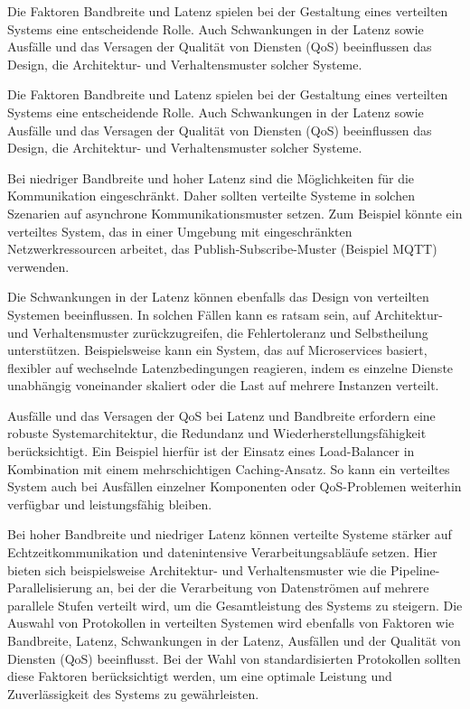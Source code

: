 Die Faktoren Bandbreite und Latenz spielen bei der Gestaltung eines verteilten Systems eine entscheidende Rolle. Auch Schwankungen in der Latenz sowie Ausfälle und das Versagen der Qualität von Diensten (QoS) beeinflussen das Design, die Architektur- und Verhaltensmuster solcher Systeme.

Die Faktoren Bandbreite und Latenz spielen bei der Gestaltung eines verteilten Systems eine entscheidende Rolle. Auch Schwankungen in der Latenz sowie Ausfälle und das Versagen der Qualität von Diensten (QoS) beeinflussen das Design, die Architektur- und Verhaltensmuster solcher Systeme.

Bei niedriger Bandbreite und hoher Latenz sind die Möglichkeiten für die Kommunikation eingeschränkt. Daher sollten verteilte Systeme in solchen Szenarien auf asynchrone Kommunikationsmuster setzen. Zum Beispiel könnte ein verteiltes System, das in einer Umgebung mit eingeschränkten Netzwerkressourcen arbeitet, das Publish-Subscribe-Muster (Beispiel MQTT) verwenden.

Die Schwankungen in der Latenz können ebenfalls das Design von verteilten Systemen beeinflussen. In solchen Fällen kann es ratsam sein, auf Architektur- und Verhaltensmuster zurückzugreifen, die Fehlertoleranz und Selbstheilung unterstützen. Beispielsweise kann ein System, das auf Microservices basiert, flexibler auf wechselnde Latenzbedingungen reagieren, indem es einzelne Dienste unabhängig voneinander skaliert oder die Last auf mehrere Instanzen verteilt.

Ausfälle und das Versagen der QoS bei Latenz und Bandbreite erfordern eine robuste Systemarchitektur, die Redundanz und Wiederherstellungsfähigkeit berücksichtigt. Ein Beispiel hierfür ist der Einsatz eines Load-Balancer in Kombination mit einem mehrschichtigen Caching-Ansatz. So kann ein verteiltes System auch bei Ausfällen einzelner Komponenten oder QoS-Problemen weiterhin verfügbar und leistungsfähig bleiben.

Bei hoher Bandbreite und niedriger Latenz können verteilte Systeme stärker auf Echtzeitkommunikation und datenintensive Verarbeitungsabläufe setzen. Hier bieten sich beispielsweise Architektur- und Verhaltensmuster wie die Pipeline-Parallelisierung an, bei der die Verarbeitung von Datenströmen auf mehrere parallele Stufen verteilt wird, um die Gesamtleistung des Systems zu steigern.
Die Auswahl von Protokollen in verteilten Systemen wird ebenfalls von Faktoren wie Bandbreite, Latenz, Schwankungen in der Latenz, Ausfällen und der Qualität von Diensten (QoS) beeinflusst. Bei der Wahl von standardisierten Protokollen sollten diese Faktoren berücksichtigt werden, um eine optimale Leistung und Zuverlässigkeit des Systems zu gewährleisten.

